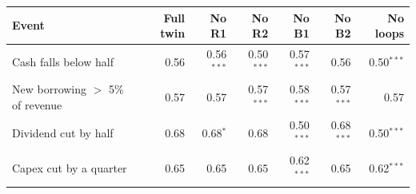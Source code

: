 \begin{tabular}{lrrrrrr}
\toprule
Event & Full twin & No R1 & No R2 & No B1 & No B2 & No loops \\
\midrule
Cash falls below half & 0.56 & 0.56$^{***}$ & 0.50$^{***}$ & 0.57$^{***}$ & 0.56 & 0.50$^{***}$ \\
New borrowing $>$ 5\% of revenue & 0.57 & 0.57 & 0.57$^{***}$ & 0.58$^{***}$ & 0.57$^{***}$ & 0.57 \\
Dividend cut by half & 0.68 & 0.68$^{*}$ & 0.68 & 0.50$^{***}$ & 0.68$^{***}$ & 0.50$^{***}$ \\
Capex cut by a quarter & 0.65 & 0.65 & 0.65 & 0.62$^{***}$ & 0.65 & 0.62$^{***}$ \\
\bottomrule
\end{tabular}
